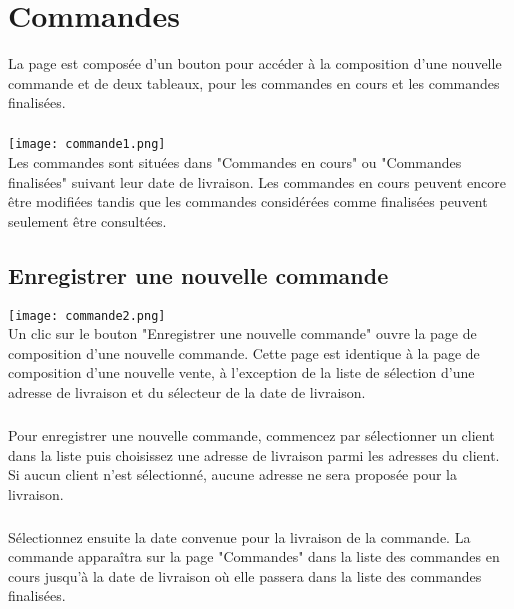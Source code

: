 \chapter{Commandes}

La page est composée d'un bouton pour accéder à la composition d'une nouvelle
commande et de deux tableaux, pour les commandes en cours et les commandes
finalisées.

\paragraph{}

\texttt{[image: commande1.png]}\\

Les commandes sont situées dans "Commandes en cours" ou "Commandes finalisées"
suivant leur date de livraison. Les commandes en cours peuvent encore être
modifiées tandis que les commandes considérées comme finalisées peuvent
seulement être consultées.

\section{Enregistrer une nouvelle commande}

\texttt{[image: commande2.png]}\\

Un clic sur le bouton "Enregistrer une nouvelle commande" ouvre la page de
composition d'une nouvelle commande. Cette page est identique à la page de
composition d'une nouvelle vente, à l'exception de la liste de sélection
d'une adresse de livraison et du sélecteur de la date de livraison.

\paragraph{}
Pour enregistrer une nouvelle commande, commencez par sélectionner un client
dans la liste puis choisissez une adresse de livraison parmi les adresses du
client. Si aucun client n'est sélectionné, aucune adresse ne sera
proposée pour la livraison.

\paragraph{}
Sélectionnez ensuite la date convenue pour la livraison de la commande.
La commande apparaîtra sur la page "Commandes" dans la liste des commandes en
cours jusqu'à la date de livraison où elle passera dans la liste des commandes
finalisées.

